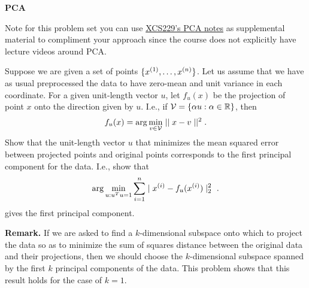 \item {} {\bf PCA} %

Note for this problem set you can use \href{https://github.com/scpd-proed/XCS229-Handouts/blob/main/Principal\%20Component\%20Analysis.pdf}{XCS229's PCA notes} as supplemental material
to compliment your approach since the course does not explicitly have lecture videos around
PCA.

Suppose we are given a set of points $\{x^{(1)},\ldots,x^{(\nexp)}\}$. Let us
assume that we have as usual preprocessed the data to have zero-mean and unit variance
in each coordinate.  For a given unit-length vector $u$, let $f_u(x)$ be the 
projection of point $x$ onto the direction given by $u$.  I.e., if 
${\cal V} = \{\alpha u : \alpha \in \Re\}$, then 
\[
f_u(x) = \arg \min_{v\in {\cal V}} \mid \mid x-v\mid \mid ^2.
\]
Show that the unit-length vector $u$ that minimizes the 
mean squared error between projected points and original points corresponds
to the first principal component for the data. I.e., show that
$$ \arg \min_{u:u^Tu=1} \sum_{i=1}^\nexp \mid x^{(i)}-f_u(x^{(i)})\mid_2^2 \ .$$
gives the first principal component.


{\bf Remark.} If we are asked to find a $k$-dimensional subspace onto which to
project the data so as to minimize the sum of squares distance between the
original data and their projections, then we should choose the $k$-dimensional
subspace spanned by the first $k$ principal components of the data.  This problem
shows that this result holds for the case of $k=1$.

